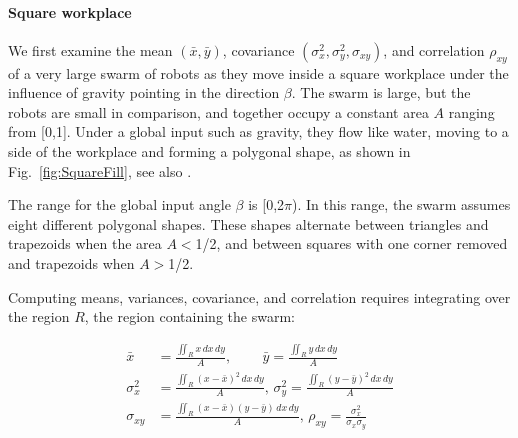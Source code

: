 \paragraph{Square workplace}
We first examine the mean $(\bar{x},\bar{y})$, covariance $(\sigma^2_x,\sigma^2_y,\sigma_{xy})$, and correlation $\rho_{xy}$ of a very large swarm of robots as they move inside a square workplace under the influence of gravity pointing in the direction $\beta$. The swarm is large, but the robots are small in comparison, and together occupy a constant area $A$ ranging from [0,1]. Under a global input such as gravity, they flow like water, moving to a side of the workplace and forming a polygonal shape, as shown in Fig.~\ref{fig:SquareFill},  see also \citep{Zhao2016mathematicaSquare}.

The range for the global input angle $\beta $ is [0,2$\pi $). In this range, the swarm assumes eight different polygonal shapes. 
These shapes alternate between triangles and trapezoids when the area $A$$<$1/2, and between squares with one corner removed and trapezoids when $A$$>$1/2.

Computing means, variances, covariance, and correlation requires integrating over the region $R$, the region containing the swarm:  %

\begin{align}
\bar{x} &=\frac{\iint_R x \,dx\,dy}{A} \label{eq:meanInSquareWorkspace}
\text{, }\qquad \bar{y}=\frac{\iint_R y \,dx\,dy}{A} \\
\sigma^2_x &=\frac{\iint_R \left(x-\bar{x}\right)^2  \,dx \,dy}{A}  \label{eq:varInSquareWorkspace}
\text{, } \sigma^2_y =\frac{\iint_R  \left(y-\bar{y}\right)^2 \,dx \,dy}{A}\\
\sigma_{xy} &= \frac{\iint_R  \left(x-\bar{x}\right) \left(y-\bar{y}\right) \, dx \,dy}{A} \label{eq:covAndcorrInSquareWorkspace}
\text{, }\rho_{xy} = \frac{\sigma^2_x}{\sigma_x\sigma_y}
\end{align}

